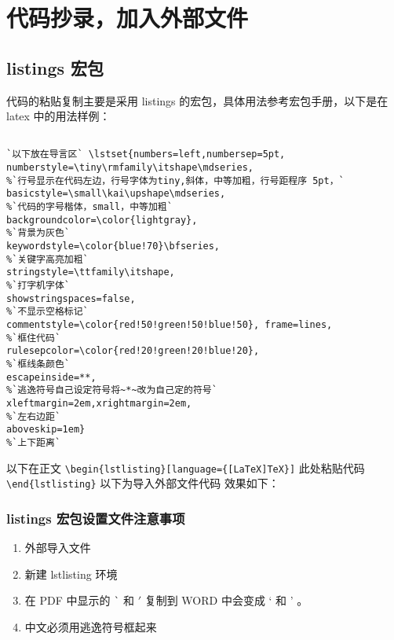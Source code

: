 \section{代码抄录，加入外部文件}
\subsection{listings 宏包}

代码的粘贴复制主要是采用 listings
的宏包，具体用法参考宏包手册，以下是在 latex 中的用法样例：

\begin{lstlisting}[language={[LaTeX]TeX}]

`以下放在导言区` \lstset{numbers=left,numbersep=5pt,
numberstyle=\tiny\rmfamily\itshape\mdseries,
%`行号显示在代码左边，行号字体为tiny,斜体，中等加粗，行号距程序 5pt，`
basicstyle=\small\kai\upshape\mdseries,
%`代码的字号楷体，small，中等加粗`
backgroundcolor=\color{lightgray},
%`背景为灰色`
keywordstyle=\color{blue!70}\bfseries,
%`关键字高亮加粗`
stringstyle=\ttfamily\itshape,
%`打字机字体`
showstringspaces=false,
%`不显示空格标记`
commentstyle=\color{red!50!green!50!blue!50}, frame=lines,
%`框住代码`
rulesepcolor=\color{red!20!green!20!blue!20},
%`框线条颜色`
escapeinside=**,
%`逃逸符号自己设定符号将~*~改为自己定的符号`
xleftmargin=2em,xrightmargin=2em,
%`左右边距`
aboveskip=1em}
%`上下距离`
\end{lstlisting}

以下在正文
\verb$\begin{lstlisting}[language={[LaTeX]TeX}]$
此处粘贴代码
\verb$\end{lstlisting}$
以下为导入外部文件代码
\verb$$
效果如下：



\subsubsection{listings 宏包设置文件注意事项}
\begin{enumerate}
  \item 外部导入文件
  \begin{latexcmd}
    
  \end{latexcmd}

  \item 新建 lstlisting 环境
   \begin{latexcmd}
    \end{latexcmd}


  \item 在 PDF 中显示的 \verb|`| 和 $'$ 复制到 WORD 中会变成 ` 和 ’ 。
  \item 中文必须用逃逸符号框起来
\end{enumerate}

